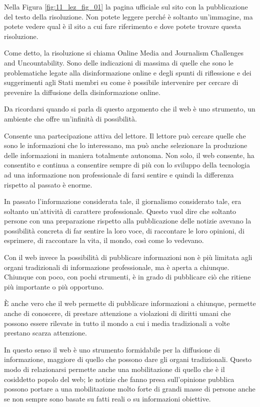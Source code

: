 Nella Figura \ref{fig:11_lez_fig_01} la pagina ufficiale sul sito con la pubblicazione del testo della risoluzione. Non potete leggere perché è soltanto un'immagine, ma potete vedere qual è il sito a cui fare riferimento e dove potete trovare questa risoluzione. \par
Come detto, la risoluzione si chiama Online Media and Journalism Challenges and Uncountability. Sono delle indicazioni di massima di quelle che sono le problematiche legate alla disinformazione online e degli spunti di riflessione e dei suggerimenti agli Stati membri su come è possibile intervenire per cercare di prevenire la diffusione della disinformazione online. \par
Da ricordarsi quando si parla di questo argomento che il web è uno strumento, un ambiente che offre un'infinità di possibilità. \par
Consente una partecipazione attiva del lettore. Il lettore può cercare quelle che sono le informazioni che lo interessano, ma può anche selezionare la produzione delle informazioni in maniera totalmente autonoma. Non solo, il web consente, ha consentito e continua a consentire sempre di più con lo sviluppo della tecnologia ad una informazione non professionale di farsi sentire e quindi la differenza rispetto al passato è enorme. \par
In passato l'informazione considerata tale, il giornalismo considerato tale, era soltanto un'attività di carattere professionale. Questo vuol dire che soltanto persone con una preparazione rispetto alla pubblicazione delle notizie avevano la possibilità concreta di far sentire la loro voce, di raccontare le loro opinioni, di esprimere, di raccontare la vita, il mondo, così come lo vedevano. \par
Con il web invece la possibilità di pubblicare informazioni non è più limitata agli organi tradizionali di informazione professionale, ma è aperta a chiunque. Chiunque con poco, con pochi strumenti, è in grado di pubblicare ciò che ritiene più importante o più opportuno. \par
È anche vero che il web permette di pubblicare informazioni a chiunque, permette anche di conoscere, di prestare attenzione a violazioni di diritti umani che possono essere rilevate in tutto il mondo a cui i media tradizionali a volte prestano scarza attenzione. \par
In questo senso il web è uno strumento formidabile per la diffusione di informazione, maggiore di quello che possono dare gli organi tradizionali. Questo modo di relazionarsi permette anche una mobilitazione di quello che è il cosiddetto popolo del web; le notizie che fanno presa sull'opinione pubblica possono portare a una mobilitazione molto forte di grandi masse di persone anche se non sempre sono basate su fatti reali o su informazioni obiettive. \par
